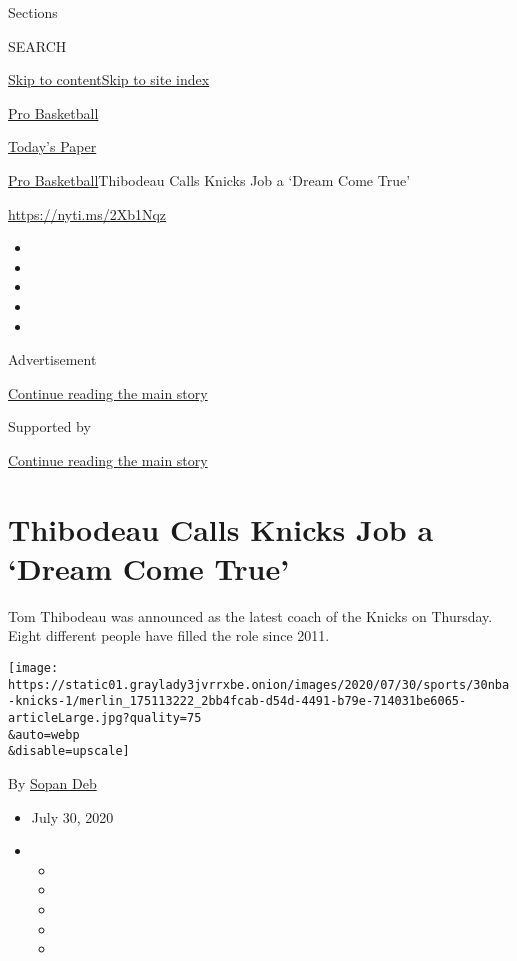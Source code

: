 Sections

SEARCH

\protect\hyperlink{site-content}{Skip to
content}\protect\hyperlink{site-index}{Skip to site index}

\href{https://www.nytimes3xbfgragh.onion/section/sports/basketball}{Pro
Basketball}

\href{https://myaccount.nytimes3xbfgragh.onion/auth/login?response_type=cookie\&client_id=vi}{}

\href{https://www.nytimes3xbfgragh.onion/section/todayspaper}{Today's
Paper}

\href{/section/sports/basketball}{Pro Basketball}\textbar{}Thibodeau
Calls Knicks Job a `Dream Come True'

\url{https://nyti.ms/2Xb1Nqz}

\begin{itemize}
\item
\item
\item
\item
\item
\end{itemize}

Advertisement

\protect\hyperlink{after-top}{Continue reading the main story}

Supported by

\protect\hyperlink{after-sponsor}{Continue reading the main story}

\hypertarget{thibodeau-calls-knicks-job-a-dream-come-true}{%
\section{Thibodeau Calls Knicks Job a `Dream Come
True'}\label{thibodeau-calls-knicks-job-a-dream-come-true}}

Tom Thibodeau was announced as the latest coach of the Knicks on
Thursday. Eight different people have filled the role since 2011.

\texttt{[image: https://static01.graylady3jvrrxbe.onion/images/2020/07/30/sports/30nba-knicks-1/merlin\_175113222\_2bb4fcab-d54d-4491-b79e-714031be6065-articleLarge.jpg?quality=75\\\&auto=webp\\\&disable=upscale]}

By \href{https://www.nytimes3xbfgragh.onion/by/sopan-deb}{Sopan Deb}

\begin{itemize}
\item
  July 30, 2020
\item
  \begin{itemize}
  \item
  \item
  \item
  \item
  \item
  \end{itemize}
\end{itemize}

